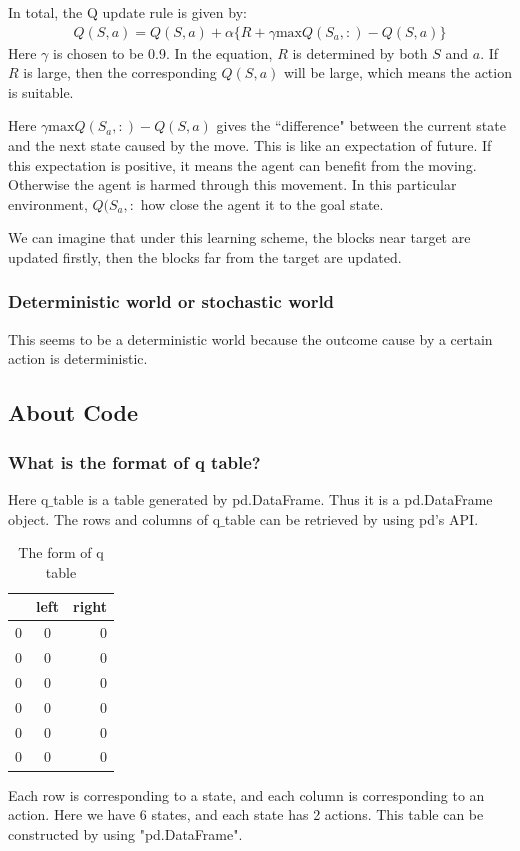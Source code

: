 \documentclass{article}
\begin{document}
In total, the Q update rule is given by:
\begin{align*}
Q(S,a) = Q(S,a) + \alpha \{R + \gamma \text{max} Q(S_a, :)-Q(S,a)\}
\end{align*}
Here $\gamma$ is chosen to be 0.9. In the equation, $R$ is determined by both $S$ and $a$. If $R$ is large, then the corresponding $Q(S,a)$ will be large, which means the action is suitable. 

Here $\gamma \text{max} Q(S_a, :)-Q(S,a)$ gives the ``difference" between the current state and the next state caused by the move. This is like an expectation of future. If this expectation is positive, it means the agent can benefit from the moving. Otherwise the agent is harmed through this movement. In this particular environment, $Q(S_a, :$ how close the agent it to the goal state.

We can imagine that under this learning scheme, the blocks near target are updated firstly, then the blocks far from the target are updated.
\subsubsection{Deterministic world or stochastic world}
This seems to be a deterministic world because the outcome cause by a certain action is deterministic.

\subsection{About Code}
\subsubsection{What is the format of q table?}
Here q$\_$table is a table generated by pd.DataFrame. Thus it is a pd.DataFrame object. The rows and columns of q$\_$table can be retrieved by using pd's API.
\begin{table}[!h]
\centering
\begin{tabular}{| l | c | r |} \hline
      & left &right     \\ \hline
  0   & 0    &   0      \\ \hline
  0   & 0    &   0      \\ \hline
  0   & 0    &   0      \\ \hline
  0   & 0    &   0      \\ \hline
  0   & 0    &   0      \\ \hline
  0   & 0    &   0      \\ \hline
\end{tabular}
\label{tab:20171217_code_q_table}
\caption{The form of q table}
\end{table}
Each row is corresponding to a state, and each column is corresponding to an action. Here we have 6 states, and each state has 2 actions. This table can be constructed by using "pd.DataFrame".
\end{document}
